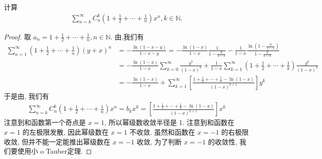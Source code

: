 \documentclass[../../main.tex]{subfiles}%
\begin{document}
\begin{example}
计算
\begin{align*}
\sum_{n=k}^{\infty} C_n^k \left(1 + \frac{1}{2} + \cdots + \frac{1}{n}\right) x^n, k \in \mathbb{N}. 
\end{align*}
\end{example}
\begin{proof}

取 $a_n = 1 + \frac{1}{2} + \cdots + \frac{1}{n}, n \in \mathbb{N}$. 由,我们有
\begin{align*}
\sum_{n=1}^{\infty} \left(1 + \frac{1}{2} + \cdots + \frac{1}{n}\right) (y + x)^n &= -\frac{\ln(1 - x - y)}{1 - x - y} = -\frac{\ln(1 - x)}{1 - x} \frac{1}{1 - \frac{y}{1 - x}} - \frac{1}{1 - x} \frac{\ln\left(1 - \frac{y}{1 - x}\right)}{1 - \frac{y}{1 - x}} \\
&= -\frac{\ln(1 - x)}{1 - x} \sum_{k=0}^{\infty} \frac{y^k}{(1 - x)^k} + \frac{1}{1 - x} \sum_{k=1}^{\infty} \left(1 + \frac{1}{2} + \cdots + \frac{1}{k}\right) \frac{y^k}{(1 - x)^k} \\
&= -\frac{\ln(1 - x)}{1 - x} + \sum_{k=1}^{\infty} \left[\frac{1 + \frac{1}{2} + \cdots + \frac{1}{k} - \ln(1 - x)}{(1 - x)^{k + 1}}\right] y^k
\end{align*}
于是由, 我们有
\begin{align*}
\sum_{n=k}^{\infty} C_n^k \left(1 + \frac{1}{2} + \cdots + \frac{1}{n}\right) x^n = b_k x^k = \left[\frac{1 + \frac{1}{2} + \cdots + \frac{1}{k} - \ln(1 - x)}{(1 - x)^{k + 1}}\right] x^k 
\end{align*}
注意到和函数第一个奇点是 $x = 1$, 所以幂级数收敛半径是 1. 注意到和函数在 $x = 1$ 的左极限发散, 因此幂级数在 $x = 1$ 不收敛. 虽然和函数在 $x = -1$ 的右极限收敛, 但并不能一定能推出幂级数在 $x = -1$ 收敛, 为了判断 $x = -1$ 的收敛性, 我们要使用小 o Tauber定理.


\end{proof}
\end{document}
